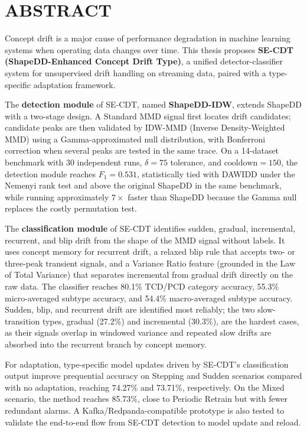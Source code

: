 \chapter*{ABSTRACT}

Concept drift is a major cause of performance degradation in machine learning systems when operating data changes over time. This thesis proposes \textbf{SE-CDT (ShapeDD-Enhanced Concept Drift Type)}, a unified detector-classifier system for unsupervised drift handling on streaming data, paired with a type-specific adaptation framework.

The \textbf{detection module} of SE-CDT, named \textbf{ShapeDD-IDW}, extends ShapeDD with a two-stage design. A Standard MMD signal first locates drift candidates; candidate peaks are then validated by IDW-MMD (Inverse Density-Weighted MMD) using a Gamma-approximated null distribution, with Bonferroni correction when several peaks are tested in the same trace. On a 14-dataset benchmark with 30 independent runs, $\delta = 75$ tolerance, and $\text{cooldown} = 150$, the detection module reaches $F_1 = 0.531$, statistically tied with DAWIDD under the Nemenyi rank test and above the original ShapeDD in the same benchmark, while running approximately $7\times$ faster than ShapeDD because the Gamma null replaces the costly permutation test.

The \textbf{classification module} of SE-CDT identifies sudden, gradual, incremental, recurrent, and blip drift from the shape of the MMD signal without labels. It uses concept memory for recurrent drift, a relaxed blip rule that accepts two- or three-peak transient signals, and a Variance Ratio feature (grounded in the Law of Total Variance) that separates incremental from gradual drift directly on the raw data. The classifier reaches 80.1\% TCD/PCD category accuracy, 55.3\% micro-averaged subtype accuracy, and 54.4\% macro-averaged subtype accuracy. Sudden, blip, and recurrent drift are identified most reliably; the two slow-transition types, gradual (27.2\%) and incremental (30.3\%), are the hardest cases, as their signals overlap in windowed variance and repeated slow drifts are absorbed into the recurrent branch by concept memory.

For adaptation, type-specific model updates driven by SE-CDT's classification output improve prequential accuracy on Stepping and Sudden scenarios compared with no adaptation, reaching 74.27\% and 73.71\%, respectively. On the Mixed scenario, the method reaches 85.73\%, close to Periodic Retrain but with fewer redundant alarms. A Kafka/Redpanda-compatible prototype is also tested to validate the end-to-end flow from SE-CDT detection to model update and reload.

